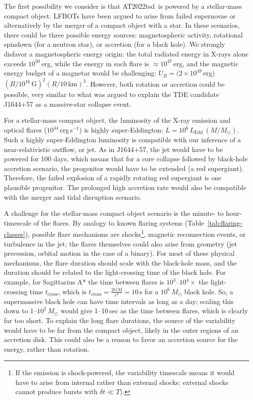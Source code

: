 \documentclass{nature_plusfigure}
\newcommand{\at}{AT2022tsd}
\begin{document}
\begin{methods}
The first possibility we consider is that \at\ is powered by a stellar-mass compact object. LFBOTs have been argued to arise from failed supernovae\cite{Perley2019,Margutti2019} or alternatively by the merger of a compact object with a star\cite{Metzger2022}. In these scenarios, there could be three possible energy sources: magnetospheric activity, rotational spindown (for a neutron star), or accretion (for a black hole). We strongly disfavor a magnetospheric energy origin: the total radiated energy in X-rays alone exceeds $10^{50}\,$erg, while the energy in each flare is $\approx10^{47}\,$erg, and the magnetic energy budget of a magnetar would be challenging: $U_B = (2\times10^{49}\,$erg)$(B/10^{16}\,\mathrm{G})^2 (R/10\,\mathrm{km})^3$. However, both rotation or accretion could be possible, very similar to what was argued to explain the TDE candidate J1644+57 as a massive-star collapse event\cite{Quataert2012}. 

For a stellar-mass compact object, the luminosity of the X-ray emission and optical flares ($10^{44}\,$erg\,s$^{-1}$) is highly super-Eddington: $L=10^{6}\,L_\mathrm{Edd}\,(M/M_\odot)$. Such a highly super-Eddington luminosity is compatible with our inference of a near-relativistic outflow, or jet. As in J1644+57, the jet would have to be powered for 100 days, which means that for a core collapse followed by black-hole accretion scenario, the progenitor would have to be extended (a red supergiant\cite{Quataert2012}). Therefore, the failed explosion of a rapidly rotating red supergiant is one plausible progenitor. The prolonged high accretion rate would also be compatible with the merger and tidal disruption scenario\cite{Metzger2022}.

A challenge for the stellar-mass compact object scenario is the minute- to hour-timescale of the flares. By analogy to known flaring systems (Table~\ref{tab:flaring-classes}), possible flare mechanisms are shocks\footnote{If the emission is shock-powered, the variability timescale means it would have to arise from internal rather than external shocks: external shocks cannot\cite{Kumar2015} produce bursts with $\delta t\ll T$).
}, magnetic reconnection events, or turbulence in the jet; the flares themselves could also arise from geometry (jet precession, orbital motion in the case of a binary). For most of these physical mechanisms, the flare duration should scale with the black-hole mass, and the duration should be related to the light-crossing time of the black hole. 
For example, for Sagittarius A* the time between flares is $10^{3}$--$10^{4}\times$ the light-crossing time $t_\mathrm{cross}$, which is $t_\mathrm{cross}=\frac{2GM}{c^3}=10\,\mathrm{s}$ for a $10^6\,M_\odot$ black hole.
So, a supermassive black hole can have time intervals as long as a day; scaling this down to 1--$10^2\,M_\odot$ would give 1--10\,sec as the time between flares, which is clearly far too short.
To explain the long flare durations, the source of the variability would have to be far from the compact object, likely in the outer regions of an accretion disk\cite{Metzger2022}. This could also be a reason to favor an accretion source for the energy, rather than rotation.


\end{methods}
\end{document}
